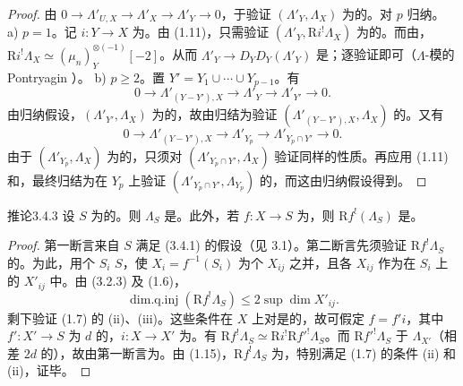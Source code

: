 \begin{proof}
由 $0\to\Lambda'_{U,X}\to\Lambda'_X\to\Lambda'_Y\to0$，于验证 $(\Lambda'_Y,\Lambda_X)$ 为的。对 $p$ 归纳。
a) $p=1$。记 $i:Y\to X$ 为。由 (1.11)，只需验证 $(\Lambda'_Y,\mathrm Ri^!\Lambda_X)$ 为的。而由，$\mathrm Ri^!\Lambda_X\simeq(\mu_n)_Y^{\otimes(-1)}[-2]$。从而 $\Lambda'_Y\to D_YD_Y(\Lambda'_Y)$ 是；逐验证即可（$\Lambda$-模的 Pontryagin ）。
b) $p\geq2$。置 $Y'=Y_1\cup\cdots\cup Y_{p-1}$。有
\[
0\longrightarrow\Lambda'_{(Y-Y'),X}\longrightarrow\Lambda'_Y\longrightarrow\Lambda'_{Y'}\longrightarrow0.
\]
由归纳假设，$(\Lambda'_{Y'},\Lambda_X)$ 为的，故由归结为验证 $(\Lambda'_{(Y-Y'),X},\Lambda_X)$ 的。又有
\[
0\longrightarrow\Lambda'_{(Y-Y'),X}\longrightarrow\Lambda'_{Y_p}\longrightarrow\Lambda'_{Y_p\cap Y'}\longrightarrow0.
\]
由于 $(\Lambda'_{Y_p},\Lambda_X)$ 为的，只须对 $(\Lambda'_{Y_p\cap Y'},\Lambda_X)$ 验证同样的性质。再应用 (1.11) 和，最终归结为在 $Y_p$ 上验证 $(\Lambda'_{Y_p\cap Y'},\Lambda_{Y_p})$ 的，而这由归纳假设得到。
\end{proof}
\begin{SGAresult}{推论}{3.4.3}
设 $S$ 为的。则 $\Lambda_S$ 是。此外，若 $f:X\to S$ 为，则 $\mathrm Rf^!(\Lambda_S)$ 是。
\end{SGAresult}
\begin{proof}
第一断言来自 $S$ 满足 (3.4.1) 的假设（见 3.1）。第二断言先须验证 $\mathrm Rf^!\Lambda_S$ 的。为此，用个 $S_i$  $S$，使 $X_i=f^{-1}(S_i)$ 为个 $X_{ij}$ 之并，且各 $X_{ij}$ 作为在 $S_i$ 上的 $X'_{ij}$ 中。由 (3.2.3) 及 (1.6)，
\[
\operatorname{dim.q.inj}(\mathrm Rf^!\Lambda_S)\leq2\sup\dim X'_{ij}.
\]
剩下验证 (1.7) 的 (ii)、(iii)。这些条件在 $X$ 上对是的，故可假定 $f=f'i$，其中 $f':X'\to S$ 为 $d$ 的，$i:X\to X'$ 为。有 $\mathrm Rf^!\Lambda_S\simeq\mathrm Ri^!\mathrm Rf'^!\Lambda_S$。而 $\mathrm Rf'^!\Lambda_S$ 于 $\Lambda_{X'}$（相差 $2d$ 的），故由第一断言为。由 (1.15)，$\mathrm Rf^!\Lambda_S$ 为，特别满足 (1.7) 的条件 (ii) 和 (ii)，证毕。
\end{proof}
